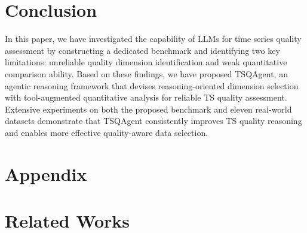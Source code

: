 \documentclass{article}
\begin{document}
\section{Conclusion}
\label{conclu}

In this paper, we have investigated the capability of LLMs for time series quality assessment by constructing a dedicated benchmark and identifying two key limitations: unreliable quality dimension identification and weak quantitative comparison ability. Based on these findings, we have proposed TSQAgent, an agentic reasoning framework that devises reasoning-oriented dimension selection with tool-augmented quantitative analysis for reliable TS quality assessment. Extensive experiments on both the proposed benchmark and eleven real-world datasets demonstrate that TSQAgent consistently improves TS quality reasoning and enables more effective quality-aware data selection. 





{
\small


}



\newpage
\appendix

\section*{Appendix}

\section{Related Works}
\label{rw}
\end{document}
